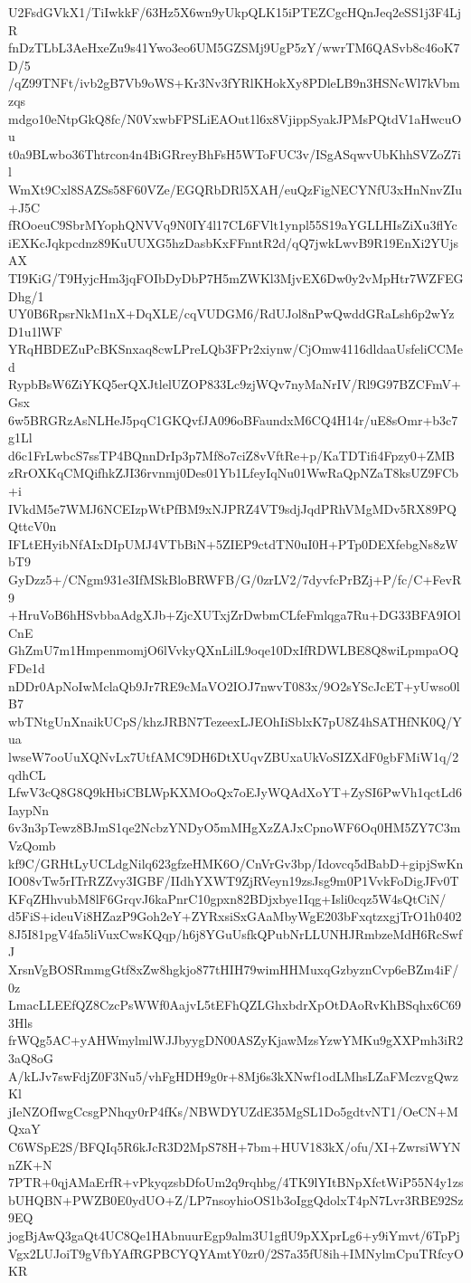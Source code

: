 U2FsdGVkX1/TiIwkkF/63Hz5X6wn9yUkpQLK15iPTEZCgcHQnJeq2eSS1j3F4LjR
fnDzTLbL3AeHxeZu9s41Ywo3eo6UM5GZSMj9UgP5zY/wwrTM6QASvb8c46oK7D/5
/qZ99TNFt/ivb2gB7Vb9oWS+Kr3Nv3fYRlKHokXy8PDleLB9n3HSNcWl7kVbmzqs
mdgo10eNtpGkQ8fc/N0VxwbFPSLiEAOut1l6x8VjippSyakJPMsPQtdV1aHwcuOu
t0a9BLwbo36Thtrcon4n4BiGRreyBhFsH5WToFUC3v/ISgASqwvUbKhhSVZoZ7il
WmXt9Cxl8SAZSs58F60VZe/EGQRbDRl5XAH/euQzFigNECYNfU3xHnNnvZIu+J5C
fROoeuC9SbrMYophQNVVq9N0IY4l17CL6FVlt1ynpl55S19aYGLLHIsZiXu3flYc
iEXKcJqkpcdnz89KuUUXG5hzDasbKxFFnntR2d/qQ7jwkLwvB9R19EnXi2YUjsAX
TI9KiG/T9HyjcHm3jqFOIbDyDbP7H5mZWKl3MjvEX6Dw0y2vMpHtr7WZFEGDhg/1
UY0B6RpsrNkM1nX+DqXLE/cqVUDGM6/RdUJol8nPwQwddGRaLsh6p2wYzD1u1lWF
YRqHBDEZuPcBKSnxaq8cwLPreLQb3FPr2xiynw/CjOmw4116dldaaUsfeliCCMed
RypbBsW6ZiYKQ5erQXJtlelUZOP833Lc9zjWQv7nyMaNrIV/Rl9G97BZCFmV+Gsx
6w5BRGRzAsNLHeJ5pqC1GKQvfJA096oBFaundxM6CQ4H14r/uE8sOmr+b3c7g1Ll
d6c1FrLwbcS7ssTP4BQnnDrIp3p7Mf8o7ciZ8vVftRe+p/KaTDTifi4Fpzy0+ZMB
zRrOXKqCMQifhkZJI36rvnmj0Des01Yb1LfeyIqNu01WwRaQpNZaT8ksUZ9FCb+i
IVkdM5e7WMJ6NCEIzpWtPfBM9xNJPRZ4VT9sdjJqdPRhVMgMDv5RX89PQQttcV0n
IFLtEHyibNfAIxDIpUMJ4VTbBiN+5ZIEP9ctdTN0uI0H+PTp0DEXfebgNs8zWbT9
GyDzz5+/CNgm931e3IfMSkBloBRWFB/G/0zrLV2/7dyvfcPrBZj+P/fc/C+FevR9
+HruVoB6hHSvbbaAdgXJb+ZjcXUTxjZrDwbmCLfeFmlqga7Ru+DG33BFA9IOlCnE
GhZmU7m1HmpenmomjO6lVvkyQXnLilL9oqe10DxIfRDWLBE8Q8wiLpmpaOQFDe1d
nDDr0ApNoIwMclaQb9Jr7RE9cMaVO2IOJ7nwvT083x/9O2sYScJcET+yUwso0lB7
wbTNtgUnXnaikUCpS/khzJRBN7TezeexLJEOhIiSblxK7pU8Z4hSATHfNK0Q/Yua
lwseW7ooUuXQNvLx7UtfAMC9DH6DtXUqvZBUxaUkVoSIZXdF0gbFMiW1q/2qdhCL
LfwV3cQ8G8Q9kHbiCBLWpKXMOoQx7oEJyWQAdXoYT+ZySI6PwVh1qctLd6IaypNn
6v3n3pTewz8BJmS1qe2NcbzYNDyO5mMHgXzZAJxCpnoWF6Oq0HM5ZY7C3mVzQomb
kf9C/GRHtLyUCLdgNilq623gfzeHMK6O/CnVrGv3bp/Idovcq5dBabD+gipjSwKn
IO08vTw5rITrRZZvy3IGBF/IIdhYXWT9ZjRVeyn19zsJsg9m0P1VvkFoDigJFv0T
KFqZHhvubM8lF6GrqvJ6kaPnrC10gpxn82BDjxbye1Iqg+Isli0cqz5W4sQtCiN/
d5FiS+ideuVi8HZazP9Goh2eY+ZYRxsiSxGAaMbyWgE203bFxqtzxgjTrO1h0402
8J5I81pgV4fa5liVuxCwsKQqp/h6j8YGuUsfkQPubNrLLUNHJRmbzeMdH6RcSwfJ
XrsnVgBOSRmmgGtf8xZw8hgkjo877tHIH79wimHHMuxqGzbyznCvp6eBZm4iF/0z
LmacLLEEfQZ8CzcPsWWf0AajvL5tEFhQZLGhxbdrXpOtDAoRvKhBSqhx6C693Hls
frWQg5AC+yAHWmylmlWJJbyygDN00ASZyKjawMzsYzwYMKu9gXXPmh3iR23aQ8oG
A/kLJv7swFdjZ0F3Nu5/vhFgHDH9g0r+8Mj6s3kXNwf1odLMhsLZaFMczvgQwzKl
jIeNZOfIwgCcsgPNhqy0rP4fKs/NBWDYUZdE35MgSL1Do5gdtvNT1/OeCN+MQxaY
C6WSpE2S/BFQIq5R6kJcR3D2MpS78H+7bm+HUV183kX/ofu/XI+ZwrsiWYNnZK+N
7PTR+0qjAMaErfR+vPkyqzsbDfoUm2q9rqhbg/4TK9lYItBNpXfctWiP55N4y1zs
bUHQBN+PWZB0E0ydUO+Z/LP7nsoyhioOS1b3oIggQdolxT4pN7Lvr3RBE92Sz9EQ
jogBjAwQ3gaQt4UC8Qe1HAbnuurEgp9alm3U1gflU9pXXprLg6+y9iYmvt/6TpPj
Vgx2LUJoiT9gVfbYAfRGPBCYQYAmtY0zr0/2S7a35fU8ih+IMNylmCpuTRfcyOKR
